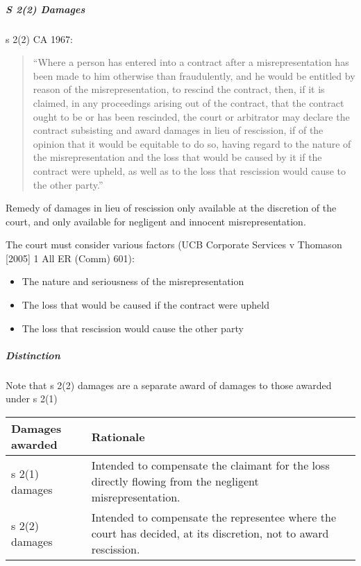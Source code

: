 \documentclass[
]{article}
\providecommand{\tightlist}{%
  \setlength{\itemsep}{0pt}\setlength{\parskip}{0pt}}
\begin{document}
\hypertarget{s-22-damages}{%
\subparagraph{S 2(2) Damages}\label{s-22-damages}}

s 2(2) CA 1967:

\begin{quote}
``Where a person has entered into a contract after a misrepresentation
has been made to him otherwise than fraudulently, and he would be
entitled by reason of the misrepresentation, to rescind the contract,
then, if it is claimed, in any proceedings arising out of the contract,
that the contract ought to be or has been rescinded, the court or
arbitrator may declare the contract subsisting and award damages in lieu
of rescission, if of the opinion that it would be equitable to do so,
having regard to the nature of the misrepresentation and the loss that
would be caused by it if the contract were upheld, as well as to the
loss that rescission would cause to the other party.''
\end{quote}

Remedy of damages in lieu of rescission only available at the discretion
of the court, and only available for negligent and innocent
misrepresentation.

The court must consider various factors (UCB Corporate Services v
Thomason {[}2005{]} 1 All ER (Comm) 601):

\begin{itemize}
\tightlist
\item
  The nature and seriousness of the misrepresentation
\item
  The loss that would be caused if the contract were upheld
\item
  The loss that rescission would cause the other party
\end{itemize}

\hypertarget{distinction}{%
\subparagraph{Distinction}\label{distinction}}

Note that s 2(2) damages are a separate award of damages to those
awarded under s 2(1)

\begin{longtable}[]{@{}ll@{}}
\toprule()
Damages awarded & Rationale \\
\midrule()
\endhead
s 2(1) damages & Intended to compensate the claimant for the loss
directly flowing from the negligent misrepresentation. \\
s 2(2) damages & Intended to compensate the representee where the court
has decided, at its discretion, not to award rescission. \\
\bottomrule()
\end{longtable}
\end{document}
